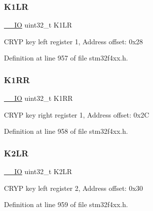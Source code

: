 \subsubsection{\texorpdfstring{K1\+LR}{K1LR}}
{\footnotesize\ttfamily \hyperlink{group___c_m_s_i_s__core__definitions_gaec43007d9998a0a0e01faede4133d6be}{\+\_\+\+\_\+\+IO} uint32\+\_\+t K1\+LR}

C\+R\+YP key left register 1, Address offset\+: 0x28 

Definition at line 957 of file stm32f4xx.\+h.

\mbox{\label{struct_c_r_y_p___type_def_a7554383cff84540eb260a3fdf55cb934}} 
\subsubsection{\texorpdfstring{K1\+RR}{K1RR}}
{\footnotesize\ttfamily \hyperlink{group___c_m_s_i_s__core__definitions_gaec43007d9998a0a0e01faede4133d6be}{\+\_\+\+\_\+\+IO} uint32\+\_\+t K1\+RR}

C\+R\+YP key right register 1, Address offset\+: 0x2C 

Definition at line 958 of file stm32f4xx.\+h.

\mbox{\label{struct_c_r_y_p___type_def_a32210fb9ecbb0b4bd127e688f3f79802}} 
\subsubsection{\texorpdfstring{K2\+LR}{K2LR}}
{\footnotesize\ttfamily \hyperlink{group___c_m_s_i_s__core__definitions_gaec43007d9998a0a0e01faede4133d6be}{\+\_\+\+\_\+\+IO} uint32\+\_\+t K2\+LR}

C\+R\+YP key left register 2, Address offset\+: 0x30 

Definition at line 959 of file stm32f4xx.\+h.

\mbox{\label{struct_c_r_y_p___type_def_a41a0448734e8ccbdd6fba98284815c6f}} 
